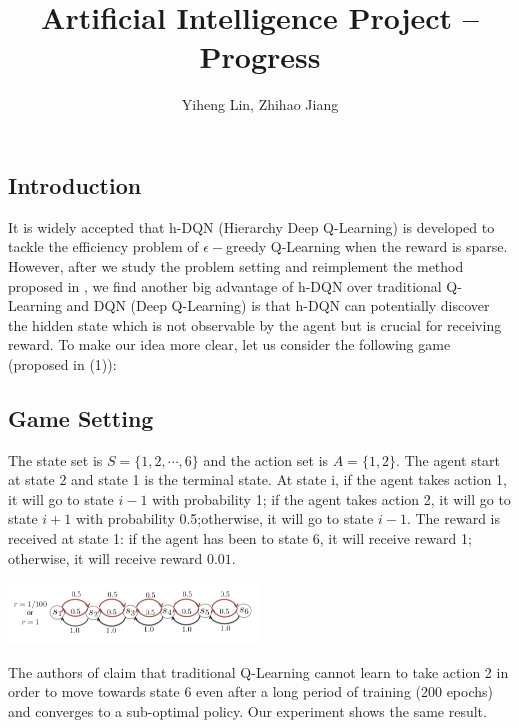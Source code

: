 \documentclass{article}
\title{\textmd{\bf Artificial Intelligence Project -- Progress}}
\date{}
\author{Yiheng Lin, Zhihao Jiang}
\begin{document}
    \begin{spacing}{1.1}
    \maketitle %

    \section{Introduction}
    It is widely accepted that h-DQN (Hierarchy Deep Q-Learning) is developed to tackle the efficiency problem of $\epsilon -$greedy Q-Learning when the reward is sparse. However, after we study the problem setting and reimplement the method proposed in \cite{AI-16}, we find another big advantage of h-DQN over traditional Q-Learning and DQN (Deep Q-Learning) \cite{AI-15} is that h-DQN can potentially discover the hidden state which is not observable by the agent but is crucial for receiving reward. To make our idea more clear, let us consider the following game (proposed in (1)):
    \subsection{Game Setting}
    The state set is $S = \{1, 2, \cdots, 6\}$ and the action set is $A = \{1, 2\}$. The agent start at state 2 and state 1 is the terminal state. At state i, if the agent takes action 1, it will go to state $i-1$ with probability 1; if the agent takes action 2, it will go to state $i+1$ with probability 0.5;otherwise, it will go to state $i-1$. The reward is received at state 1: if the agent has been to state 6, it will receive reward 1; otherwise, it will receive reward $0.01$.

    \begin{center}
        \includegraphics[width = 0.5\textwidth]{game.png}
    \end{center}

    The authors of \cite{AI-16} claim that traditional Q-Learning cannot learn to take action 2 in order to move towards state 6 even after a long period of training (200 epochs) and converges to a sub-optimal policy. Our experiment shows the same result.


\end{spacing}
\end{document}
